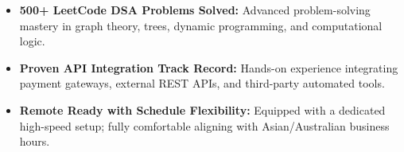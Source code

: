 \documentclass[a4paper,10pt]{article}
\begin{document}
\begin{itemize}

    \item \textbf{500+ LeetCode DSA Problems Solved:} Advanced problem-solving mastery in graph theory, trees, dynamic programming, and computational logic.

    \item \textbf{Proven API Integration Track Record:} Hands-on experience integrating payment gateways, external REST APIs, and third-party automated tools.

    \item \textbf{Remote Ready with Schedule Flexibility:} Equipped with a dedicated high-speed setup; fully comfortable aligning with Asian/Australian business hours.

\end{itemize}

\end{document}
